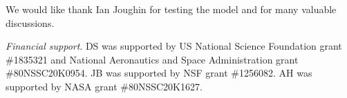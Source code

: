 \documentclass[journal abbreviation, manuscript]{copernicus}
\begin{document}
\appendixfigures  %

\appendixtables   %






\begin{acknowledgements}
We would like thank Ian Joughin for testing the model and for many valuable discussions.
\end{acknowledgements}

\textit{Financial support}.
DS was supported by US National Science Foundation grant \#1835321 and National Aeronautics and Space Administration grant \#80NSSC20K0954.
JB was supported by NSF grant \#1256082.
AH was supported by NASA grant \#80NSSC20K1627.












\end{document}

